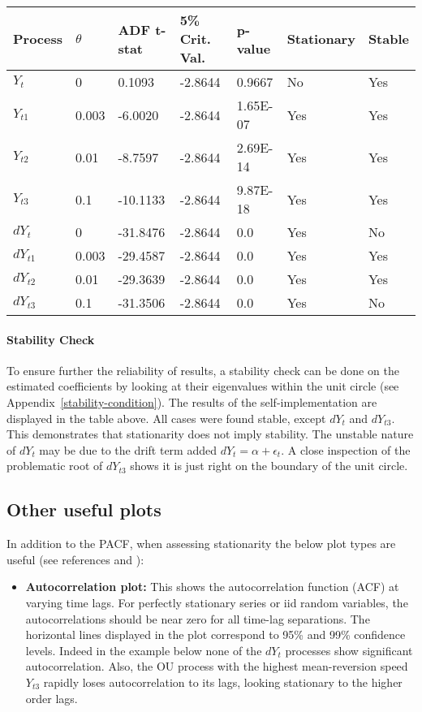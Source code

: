 \documentclass[11pt]{article}
\providecommand{\tightlist}{%
      \setlength{\itemsep}{0pt}\setlength{\parskip}{0pt}}
\begin{document}
\newpage 

    \begin{longtable}[]{@{}lllllll@{}}
\toprule
Process & $\theta$ & ADF t-stat & 5\% Crit. Val. & p-value & Stationary & Stable\tabularnewline
\midrule
\endhead
$Y_{t}$ & 0 & 0.1093 & -2.8644 & 0.9667 & No & Yes\tabularnewline
$Y_{t1}$ & 0.003 & -6.0020 & -2.8644 & 1.65E-07 & Yes & Yes\tabularnewline
$Y_{t2}$ & 0.01 & -8.7597 & -2.8644 & 2.69E-14 & Yes & Yes\tabularnewline
$Y_{t3}$ & 0.1 & -10.1133 & -2.8644 & 9.87E-18 & Yes & Yes\tabularnewline
$dY_{t}$ & 0 & -31.8476 & -2.8644 & 0.0 & Yes & No\tabularnewline
$dY_{t1}$ & 0.003 & -29.4587 & -2.8644 & 0.0 & Yes & Yes\tabularnewline
$dY_{t2}$ & 0.01 & -29.3639 & -2.8644 & 0.0 & Yes & Yes\tabularnewline
$dY_{t3}$ & 0.1 & -31.3506 & -2.8644 & 0.0 & Yes & No\tabularnewline
\bottomrule
\end{longtable}
    \paragraph{Stability Check}\label{stability-check}
To ensure further the reliability of results, a stability check can be
done on the estimated coefficients by looking at their eigenvalues
within the unit circle (see Appendix~\ref{stability-condition}). The results of the
self-implementation are displayed in the table above. All cases were
found stable, except $dY_{t}$ and $dY_{t3}$. This demonstrates that
stationarity does not imply stability. The unstable nature of $dY_{t}$ may
be due to the drift term added \(dY_t = \alpha + \epsilon_t\). A close
inspection of the problematic root of $dY_{t3}$ shows it is just right on
the boundary of the unit circle.

    \subsection{Other useful plots}\label{other-useful-plots}
    
In addition to the PACF, when assessing stationarity the below plot types are useful (see
references \cite{pandasref1} and \cite{pandasref2}):
\begin{itemize}
\tightlist
\item
  \textbf{Autocorrelation plot:} This shows the autocorrelation function
  (ACF) at varying time lags. For perfectly stationary series or iid
  random variables, the autocorrelations should be near zero for all
  time-lag separations. The horizontal lines displayed in the plot
  correspond to 95\% and 99\% confidence levels. Indeed in the example below none of
  the $dY_t$  processes show significant autocorrelation. Also, the
  OU process with the highest mean-reversion speed $Y_{t3}$ rapidly loses
  autocorrelation to its lags, looking  stationary to the higher order lags.
\end{itemize}
\end{document}
